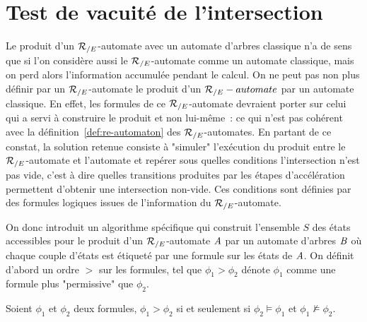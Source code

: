\section{Test de vacuité de l'intersection}
\label{intersection:sec}
Le produit d'un ${\mathcal R_{/E}}$-automate avec un automate d'arbres classique n'a de sens que si l'on considère
aussi le ${\mathcal R_{/E}}$-automate comme un automate classique, mais on perd alors l'information accumulée pendant
le calcul. On ne peut pas non plus définir par un ${\mathcal R_{/E}}$-automate le produit d'un ${\mathcal R_{/E}}-automate$ par un automate
classique. En effet, les formules de ce ${\mathcal R_{/E}}$-automate devraient porter sur celui qui a servi à construire le produit
et non lui-même~: ce qui n'est pas cohérent avec la définition~\ref{def:re-automaton} des ${\mathcal R_{/E}}$-automates. 
En partant de ce constat, la solution retenue consiste à "simuler" l'exécution du produit
entre le ${\mathcal R_{/E}}$-automate et l'automate et repérer sous quelles conditions l'intersection n'est pas vide,
c'est à dire quelles transitions produites par les étapes d'accélération permettent d'obtenir une intersection
non-vide. Ces conditions sont définies par des formules logiques issues de l'information du ${\mathcal R_{/E}}$-automate.

On donc introduit un algorithme spécifique qui construit l'ensemble $S$ des états accessibles pour le 
produit d'un ${\mathcal R_{/E}}$-automate $\mathit A$ par un automate d'arbres $\mathit B$  où chaque couple d'états est étiqueté
par une formule sur les états de $\mathit A$. On définit d'abord un ordre $>$ sur les formules, tel
que $\phi_1 > \phi_2$ dénote $\phi_1$ comme une formule plus "permissive" que $\phi_2$.

\begin{definition}
Soient $\phi_1$ et $\phi_2$ deux formules, $\phi_1 > \phi_2$ si et seulement si $\phi_2 \models \phi_1$
et $\phi_1 \not \models \phi_2$.
\end{definition}


